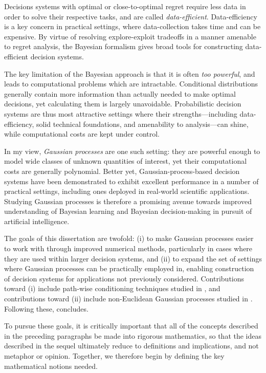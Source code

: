 \documentclass[11pt]{book}
\begin{document}
Decisions systems with optimal or close-to-optimal regret require less data in order to solve their respective tasks, and are called \emph{data-efficient}.
Data-efficiency is a key concern in practical settings, where data-collection takes time and can be expensive.
By virtue of resolving explore-exploit tradeoffs in a manner amenable to regret analysis, the Bayesian formalism gives broad tools for constructing data-efficient decision systems.

The key limitation of the Bayesian approach is that it is often \emph{too powerful}, and leads to computational problems which are intractable.
Conditional distributions generally contain more information than actually needed to make optimal decisions, yet calculating them is largely unavoidable.
Probabilistic decision systems are thus most attractive settings where their strengths---including data-efficiency, solid technical foundations, and amenability to analysis---can shine, while computational costs are kept under control.

In my view, \emph{Gaussian processes} are one such setting: they are powerful enough to model wide classes of unknown quantities of interest, yet their computational costs are generally polynomial.
Better yet, Gaussian-process-based decision systems have been demonstrated to exhibit excellent performance in a number of practical settings, including ones deployed in real-world scientific applications.
Studying Gaussian processes is therefore a promising avenue towards improved understanding of Bayesian learning and Bayesian decision-making in pursuit of artificial intelligence.

The goals of this dissertation are twofold: (i) to make Gaussian processes easier to work with through improved numerical methods, particularly in cases where they are used within larger decision systems, and (ii) to expand the set of settings where Gaussian processes can be practically employed in, enabling construction of decision systems for applications not previously considered.
Contributions toward (i) include path-wise conditioning techniques studied in , and contributions toward (ii) include non-Euclidean Gaussian processes studied in .
Following these,  concludes.

To pursue these goals, it is critically important that all of the concepts described in the preceding paragraphs be made into rigorous mathematics, so that the ideas described in the sequel ultimately reduce to definitions and implications, and not metaphor or opinion.
Together, we therefore begin by defining the key mathematical notions needed.
\end{document}
